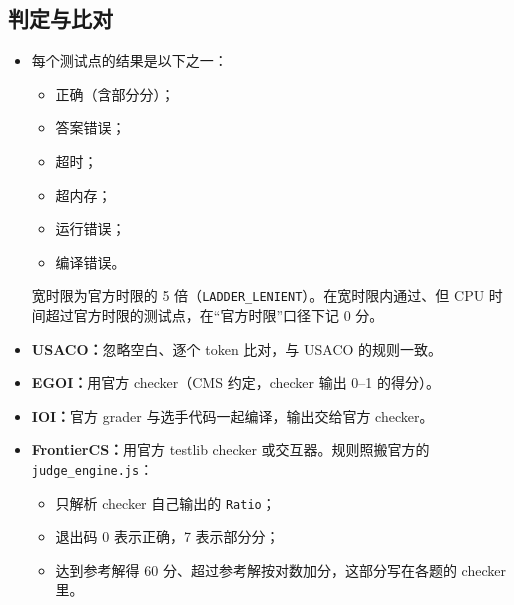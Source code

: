 \documentclass[11pt,a4paper,fontset=none]{ctexart}
\begin{document}
\subsection{判定与比对}
\begin{itemize}
  \item 每个测试点的结果是以下之一：
    \begin{itemize}
      \item 正确（含部分分）；
      \item 答案错误；
      \item 超时；
      \item 超内存；
      \item 运行错误；
      \item 编译错误。
    \end{itemize}
    宽时限为官方时限的 5 倍（\texttt{LADDER\_LENIENT}）。在宽时限内通过、但 CPU 时间超过官方时限的测试点，在“官方时限”口径下记 0 分。
  \item \textbf{USACO：}忽略空白、逐个 token 比对，与 USACO 的规则一致。
  \item \textbf{EGOI：}用官方 checker（CMS 约定，checker 输出 0--1 的得分）。
  \item \textbf{IOI：}官方 grader 与选手代码一起编译，输出交给官方 checker。
  \item \textbf{FrontierCS：}用官方 testlib checker 或交互器。规则照搬官方的 \texttt{judge\_engine.js}：
    \begin{itemize}
      \item 只解析 checker 自己输出的 \texttt{Ratio}；
      \item 退出码 0 表示正确，7 表示部分分；
      \item 达到参考解得 60 分、超过参考解按对数加分，这部分写在各题的 checker 里。
    \end{itemize}
\end{itemize}
\end{document}
